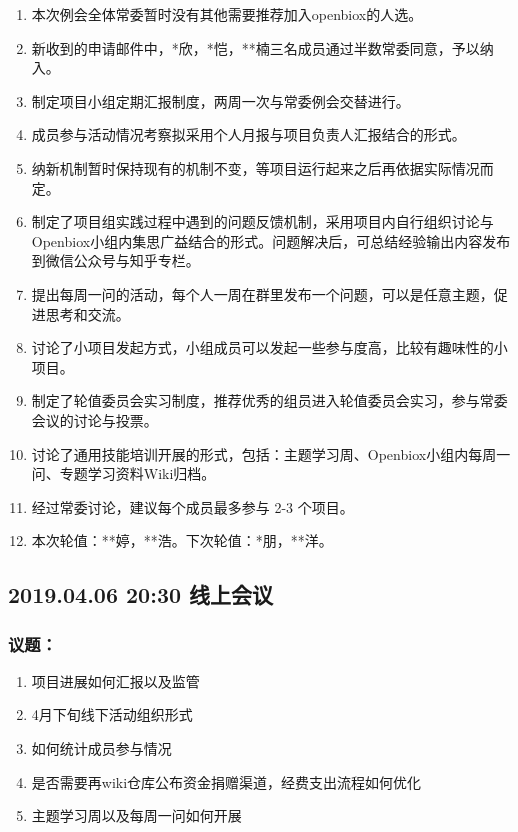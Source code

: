 \documentclass[]{article}
\providecommand{\tightlist}{%
  \setlength{\itemsep}{0pt}\setlength{\parskip}{0pt}}
\begin{document}
\begin{enumerate}
\def\labelenumi{\arabic{enumi}.}
\tightlist
\item
  本次例会全体常委暂时没有其他需要推荐加入openbiox的人选。
\item
  新收到的申请邮件中，*欣，*恺，**楠三名成员通过半数常委同意，予以纳入。
\item
  制定项目小组定期汇报制度，两周一次与常委例会交替进行。
\item
  成员参与活动情况考察拟采用个人月报与项目负责人汇报结合的形式。
\item
  纳新机制暂时保持现有的机制不变，等项目运行起来之后再依据实际情况而定。
\item
  制定了项目组实践过程中遇到的问题反馈机制，采用项目内自行组织讨论与Openbiox小组内集思广益结合的形式。问题解决后，可总结经验输出内容发布到微信公众号与知乎专栏。
\item
  提出每周一问的活动，每个人一周在群里发布一个问题，可以是任意主题，促进思考和交流。
\item
  讨论了小项目发起方式，小组成员可以发起一些参与度高，比较有趣味性的小项目。
\item
  制定了轮值委员会实习制度，推荐优秀的组员进入轮值委员会实习，参与常委会议的讨论与投票。
\item
  讨论了通用技能培训开展的形式，包括：主题学习周、Openbiox小组内每周一问、专题学习资料Wiki归档。
\item
  经过常委讨论，建议每个成员最多参与 2-3 个项目。
\item
  本次轮值：**婷，**浩。下次轮值：*朋，**洋。
\end{enumerate}

\subsection{2019.04.06 20:30 线上会议}\label{-2}

\subsubsection{议题：}

\begin{enumerate}
\def\labelenumi{\arabic{enumi}.}
\tightlist
\item
  项目进展如何汇报以及监管
\item
  4月下旬线下活动组织形式
\item
  如何统计成员参与情况
\item
  是否需要再wiki仓库公布资金捐赠渠道，经费支出流程如何优化
\item
  主题学习周以及每周一问如何开展
\end{enumerate}
\end{document}
